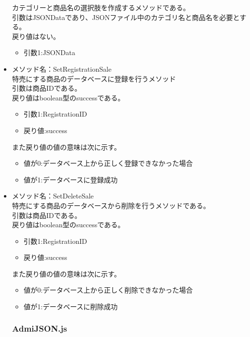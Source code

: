 \documentclass[a4j]{jarticle}
\begin{document}
\begin{itemize}
カテゴリーと商品名の選択肢を作成するメソッドである。\\
引数はJSONDataであり、JSONファイル中のカテゴリ名と商品名を必要とする。\\
戻り値はない。
	\begin{itemize}
		\item 引数1:JSONData
	\end{itemize}

\item メソッド名：SetRegistrationSale\\

特売にする商品のデータベースに登録を行うメソッド\\
引数は商品IDである。\\%
戻り値はboolean型のsuccessである。

	\begin{itemize}
		\item 引数1:RegistrationID
		\item 戻り値:success
	\end{itemize}
また戻り値の値の意味は次に示す。
	\begin{itemize}
		\item 値が0:データベース上から正しく登録できなかった場合
		\item 値が1:データベースに登録成功
	\end{itemize}
\item メソッド名：SetDeleteSale\\

特売にする商品のデータベースから削除を行うメソッドである。\\
引数は商品IDである。\\
戻り値はboolean型のsuccessである。

	\begin{itemize}
		\item 引数1:RegistrationID
		\item 戻り値:success
	\end{itemize}
また戻り値の値の意味は次に示す。
	\begin{itemize}
		\item 値が0:データベース上から正しく削除できなかった場合
		\item 値が1:データベースに削除成功
	\end{itemize}
	\subsubsection{AdmiJSON.js}


\end{itemize}
\end{document}
